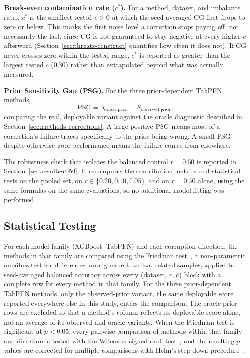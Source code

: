 \textbf{Break-even contamination rate ($c^*$).} For a method, dataset, and
imbalance ratio, $c^*$ is the smallest tested $c > 0$ at which the
seed-averaged CG first drops to zero or below. This marks the first noise
level a correction stops paying off, not necessarily the last, since CG is
not guaranteed to stay negative at every higher $c$ afterward
(Section~\ref{sec:threats-construct} quantifies how often it does not). If
CG never crosses zero within the tested range, $c^*$ is reported as greater
than the largest tested $c$ (0.30) rather than extrapolated beyond what was
actually measured.

\textbf{Prior Sensitivity Gap (PSG).} For the three prior-dependent TabPFN
methods,
\begin{equation}
\text{PSG} = S_{\text{oracle prior}} - S_{\text{observed prior}},
\label{eq:psg}
\end{equation}
comparing the real, deployable variant against the oracle diagnostic
described in Section~\ref{sec:methods-corrections}. A large positive PSG
means most of a correction's failure traces specifically to the prior being
wrong. A small PSG despite otherwise poor performance means the failure comes
from elsewhere.

The robustness check that isolates the balanced control $r{=}0.50$ is reported in Section~\ref{sec:results-r050}. It recomputes the contribution metrics and statistical tests on the pooled set, on $r \in \{0.20, 0.10, 0.05\}$, and on $r{=}0.50$ alone, using the same formulas on the same evaluations, so no additional model fitting was performed.

\subsection{Statistical Testing}
\label{sec:methods-statistics}

For each model family (XGBoost, TabPFN) and each corruption direction, the
methods in that family are compared using the Friedman
test~\cite{friedman1937ranks}, a non-parametric omnibus test for differences
among more than two related samples, applied to seed-averaged balanced
accuracy across every (dataset, $r$, $c$) block with a complete row for every
method in that family. For the three prior-dependent TabPFN methods, only
the observed-prior variant, the same deployable score reported everywhere
else in this study, enters the comparison. The oracle-prior rows are
excluded so that a method's column reflects its deployable score alone, not
an average of its observed and oracle variants. When
the Friedman test is
significant at $p<0.05$, every pairwise comparison of methods within that
family and direction is tested with the Wilcoxon signed-rank
test~\cite{wilcoxon1945ranking}, and the resulting $p$-values are corrected
for multiple comparisons with Holm's step-down
procedure~\cite{holm1979sequential}.


